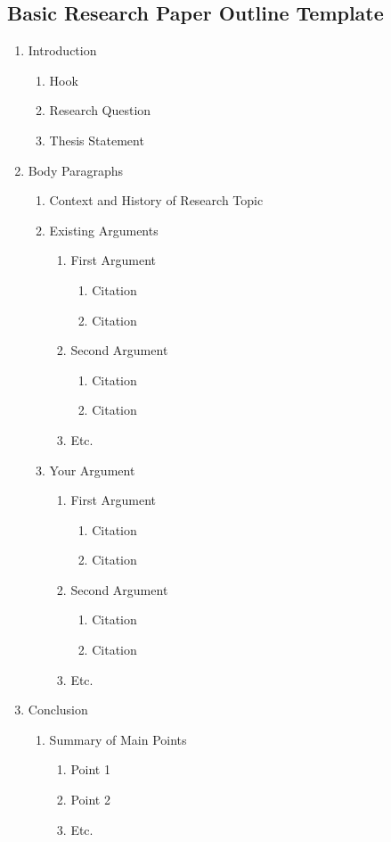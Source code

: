 \documentclass[letterpaper, 12pt]{article}
\begin{document}
\subsection*{Basic Research Paper Outline Template}
\begin{enumerate}
  \item Introduction
  \begin{enumerate}
    \item Hook
    \item Research Question
    \item Thesis Statement
  \end{enumerate}
  \item Body Paragraphs
  \begin{enumerate}
    \item Context and History of Research Topic
    \item Existing Arguments
    \begin{enumerate}
      \item First Argument
      \begin{enumerate}
        \item Citation
        \item Citation
      \end{enumerate}
      \item Second Argument
      \begin{enumerate}
        \item Citation
        \item Citation
      \end{enumerate}
      \item Etc.
    \end{enumerate}
    \item Your Argument
    \begin{enumerate}
      \item First Argument
      \begin{enumerate}
        \item Citation
        \item Citation
      \end{enumerate}
      \item Second Argument
      \begin{enumerate}
        \item Citation
        \item Citation
      \end{enumerate}
      \item Etc.
    \end{enumerate}
  \end{enumerate}
  \item Conclusion
  \begin{enumerate}
    \item Summary of Main Points
    \begin{enumerate}
      \item Point 1
      \item Point 2
      \item Etc.
    \end{enumerate}
  \end{enumerate}
\end{enumerate}
\end{document}
